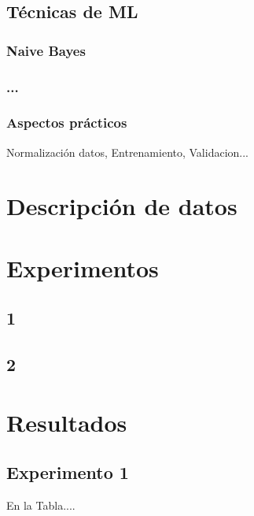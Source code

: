 \documentclass[12pt,a4paper,Spanish]{book}
\begin{document}
\section{Técnicas de ML}


\subsection{Naive Bayes}\label{Modelo OLS}

\subsection{...}

\subsection{Aspectos prácticos}
Normalización datos, Entrenamiento, Validacion...
\chapter{Descripción de datos}


\chapter{Experimentos}


\section{1}
\section{2}





\chapter{Resultados}\label{Analisis exploratorio}



\section{Experimento 1}

En la Tabla....
\end{document}
